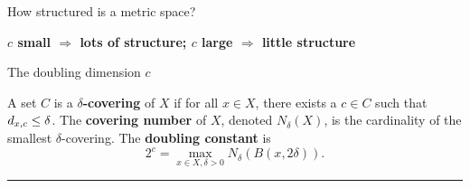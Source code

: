 \begin{frame}{How structured is a metric space?}
\begin{center}
\end{center}


\pause
\vspace{0.1in}
    \textbf{
$c$ small $\Rightarrow$ lots of structure; $c$ large $\Rightarrow$ little structure
}

\end{frame}


\begin{frame}{The doubling dimension $c$}

A set $C$ is a \textbf{$\delta$-covering} of $X$ if for all $x\in X$, there exists a $c \in C$ such that $d_{{x},{c}} \le \delta$.
The \textbf{covering number} of $X$, denoted $N_\delta(X)$, is the cardinality of the smallest $\delta$-covering.
The \textbf{doubling constant} is 
\begin{equation}
2^c = \max_{x\in X,\delta>0} N_\delta( B(x,2\delta))
.
\end{equation}

%
%
%

\vspace{0.1in}
\hrule
\vspace{0.1in}

\end{frame}
